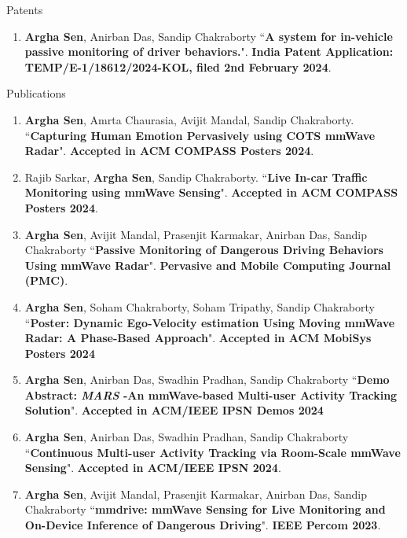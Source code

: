 \documentclass{resume} %
\begin{document}
	\begin{rSection}{Patents}
		\begin{enumerate}
			\item \textbf{Argha Sen}, Anirban Das, Sandip Chakraborty ``\textbf{A system for in-vehicle passive monitoring of driver behaviors.}". \textbf{India Patent Application: TEMP/E-1/18612/2024-KOL, filed 2nd February 2024}.
		\end{enumerate} 
	\end{rSection}
	\newpage
	\begin{rSection}{Publications} 
		\begin{enumerate}
			\small
			\item \textbf{Argha Sen}, Amrta Chaurasia, Avijit Mandal, Sandip Chakraborty. ``\textbf{Capturing Human Emotion Pervasively using COTS mmWave Radar}". \textbf{Accepted in ACM COMPASS Posters 2024}.
			
			\item Rajib Sarkar, \textbf{Argha Sen}, Sandip Chakraborty. ``\textbf{Live In-car Traffic Monitoring using mmWave Sensing}". \textbf{Accepted in ACM COMPASS Posters 2024}.
			
			\item \textbf{Argha Sen}, Avijit Mandal, Prasenjit Karmakar, Anirban Das, Sandip Chakraborty ``\textbf{Passive Monitoring of Dangerous Driving Behaviors Using mmWave Radar}". \textbf{Pervasive and Mobile Computing Journal (PMC)}.
			
			\item \textbf{Argha Sen}, Soham Chakraborty, Soham Tripathy, Sandip Chakraborty ``\textbf{Poster: Dynamic Ego-Velocity estimation Using Moving mmWave Radar: A Phase-Based Approach}". \textbf{Accepted in ACM MobiSys Posters 2024}
			\item \textbf{Argha Sen}, Anirban Das, Swadhin Pradhan, Sandip Chakraborty ``\textbf{Demo Abstract: \textit{MARS} -An mmWave-based Multi-user Activity Tracking Solution}". \textbf{Accepted in ACM/IEEE IPSN Demos 2024}
			
			\item \textbf{Argha Sen}, Anirban Das, Swadhin Pradhan, Sandip Chakraborty ``\textbf{Continuous Multi-user Activity Tracking via Room-Scale mmWave Sensing}". \textbf{Accepted in ACM/IEEE IPSN 2024}.
			
			\item \textbf{Argha Sen}, Avijit Mandal, Prasenjit Karmakar, Anirban Das, Sandip Chakraborty ``\textbf{mmdrive: mmWave Sensing for Live Monitoring and On-Device Inference of Dangerous Driving}". \textbf{IEEE Percom 2023}.
			

\end{enumerate}
\end{rSection}
\end{document}
